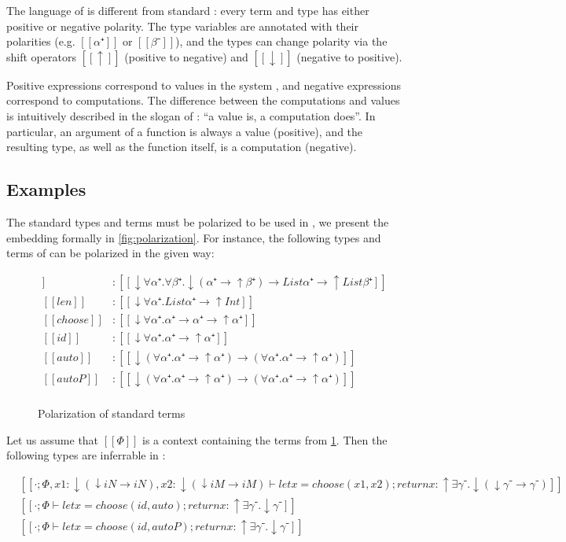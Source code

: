 
The language of \fexists is different from standard \systemf:
every term and type has either positive or negative polarity.
The type variables are annotated with their polarities
(e.g. $[[α⁺]]$ or $[[β⁻]]$), and the types can change polarity
via the shift operators $[[↑]]$ (positive to negative) and
$[[↓]]$ (negative to positive).

Positive expressions correspond to values in the \CBPV system
\cite{levy2006:cbpv}, and negative expressions correspond to computations.
The difference between the computations and values is intuitively described 
in the slogan of \CBPV: ``a value is, a computation does''. 
In particular, an argument of a function is always a value (\ie positive), 
and the resulting type, as well as the function itself, 
is a computation (\ie negative).

\subsection{Examples}

The standard \systemf types and terms must be polarized to be used in \fexists, 
we present the embedding formally in \cref{fig:polarization}.
For instance, the following types and terms of \systemf 
can be polarized in the given way:

\begin{figure}[h]
  \begin{align*}
    [[map]] &: [[↓∀α⁺.∀β⁺.↓(α⁺ → ↑β⁺) → List α⁺ → ↑List β⁺]] \\
    [[len]] &: [[↓∀α⁺.List α⁺ → ↑Int]] \\
    [[choose]] &: [[↓∀α⁺.α⁺ → α⁺ → ↑α⁺]] \\
    [[id]] &: [[↓∀α⁺.α⁺ → ↑α⁺]] \\
    [[auto]] &: [[↓(∀α⁺.α⁺ → ↑α⁺) → (∀α⁺.α⁺ → ↑α⁺)]]\\
    [[autoP]] &: [[↓(∀α⁺.α⁺ → ↑α⁺) → (∀α⁺.α⁺ → ↑α⁺)]]\\
  \end{align*}
  \caption{Polarization of standard \systemf terms}
  \label{fig:polarization-examples}
\end{figure}


Let us assume that $[[Φ]]$ is a context containing the terms from \cref{fig:polarization-examples}.
Then the following types are inferrable in \fexists:

\begin{align*}
  &[[· ; Φ, x1:↓(↓iN → iN), x2:↓(↓iM → iM) ⊢ let x = choose (x1, x2); return x : ↑ ∃γ⁻.↓(↓γ⁻ → γ⁻)]]\\
  &[[· ; Φ ⊢ let x = choose (id, auto); return x : ↑ ∃γ⁻.↓γ⁻]]\\
  &[[· ; Φ ⊢ let x = choose (id, autoP); return x : ↑ ∃γ⁻.↓γ⁻]]\\
\end{align*}

